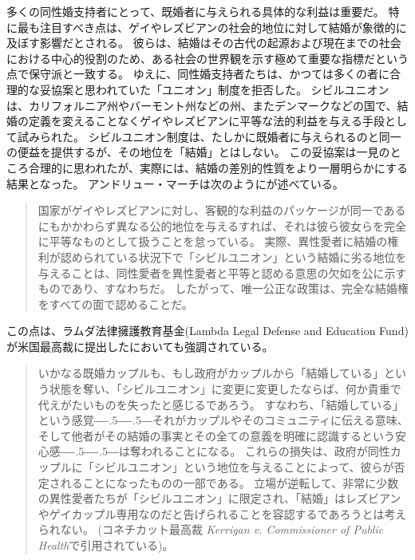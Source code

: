 \documentclass[paper=a4,book,openany]{jlreq}
\def\DDASH{―\kern-.5\zw―\kern-.5\zw―}
\begin{document}
多くの同性婚支持者にとって、既婚者に与えられる具体的な利益は重要だ。
特に最も注目すべき点は、ゲイやレズビアンの社会的地位に対して結婚が象徴的に及ぼす影響だとされる。
彼らは、結婚はその古代の起源および現在までの社会における中心的役割のため、ある社会の世界観を示す極めて重要な指標だという点で保守派と一致する。
ゆえに、同性婚支持者たちは、かつては多くの者に合理的な妥協案と思われていた「ユニオン」制度を拒否した。
シビルユニオンは、カリフォルニア州やバーモント州などの州、またデンマークなどの国で、結婚の定義を変えることなくゲイやレズビアンに平等な法的利益を与える手段として試みられた。
シビルユニオン制度は、たしかに既婚者に与えられるのと同一の便益を提供するが、その地位を「結婚」とはしない。
この妥協案は一見のところ合理的に思われたが、実際には、結婚の差別的性質をより一層明らかにする結果となった。
アンドリュー・マーチは次のようにが述べている。

\begin{quote}
国家がゲイやレズビアンに対し、客観的な利益のパッケージが同一であるにもかかわらず異なる公的地位を与えるすれば、それは彼ら彼女らを完全に平等なものとして扱うことを怠っている。
実際、異性愛者に結婚の権利が認められている状況下で「シビルユニオン」という結婚に劣る地位を与えることは、同性愛者を異性愛者と平等と認める意思の欠如を公に示すものであり、すなわちだ。
したがって、唯一公正な政策は、完全な結婚権をすべての面で認めることだ。\citep[p.254]{march11:_is_there_right_polyg}
\end{quote}

この点は、ラムダ法律擁護教育基金(Lambda Legal Defense and Education Fund)が米国最高裁に提出したにおいても強調されている。

\begin{quote}
いかなる既婚カップルも、もし政府がカップルから「結婚している」という状態を奪い、「シビルユニオン」に変更に変更したならば、何か貴重で代えがたいものを失ったと感じるであろう。
すなわち、「結婚している」という感覚{\DDASH}それがカップルやそのコミュニティに伝える意味、そして他者がその結婚の事実とその全ての意義を明確に認識するという安心感{\DDASH}は奪われることになる。
これらの損失は、政府が同性カップルに「シビルユニオン」という地位を与えることによって、彼らが否定されることになったものの一部である。
立場が逆転して、非常に少数の異性愛者たちが「シビルユニオン」に限定され、「結婚」はレズビアンやゲイカップル専用なのだと告げられることを容認するであろうとは考えられない。
(コネチカット最高裁 \emph{Kerrigan v. Commissioner of Public Health}で引用されている)。
\end{quote}
\end{document}
